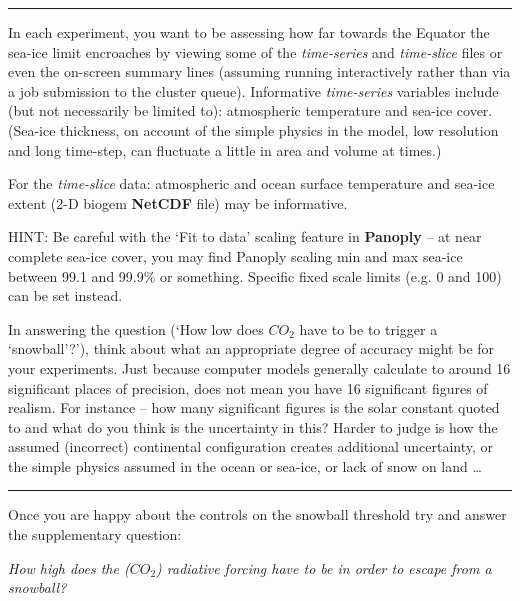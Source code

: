 \documentclass[11pt,fleqn]{book} %
\begin{document}
\vspace{1mm}
\noindent\rule{4cm}{0.5pt}
\vspace{2mm}

\noindent In each experiment, you want to be assessing how far towards the Equator the sea-ice limit encroaches by viewing some of the \textit{time-series} and \textit{time-slice} files or even the on-screen summary lines (assuming running interactively rather than via a job submission to the cluster queue). Informative \textit{time-series} variables include (but not necessarily be limited to): atmospheric temperature and sea-ice cover. (Sea-ice thickness, on account of the simple physics in the model, low resolution and long time-step, can fluctuate a little in area and volume at times.)

For the \textit{time-slice} data: atmospheric and ocean surface temperature and sea-ice extent (2-D biogem \textbf{NetCDF} file) may be informative.

HINT: Be careful with the ‘\textsf{Fit to data}’ scaling feature in \textbf{Panoply} – at near complete sea-ice cover, you may find Panoply scaling min and max sea-ice between 99.1 and 99.9\% or something. Specific fixed scale limits (e.g. 0 and 100) can be set instead.

In answering the question (‘How low does \(CO_{2}\) have to be to trigger a ‘snowball’?’), think about what an appropriate degree of accuracy might be for your experiments. Just because computer models generally calculate to around 16 significant places of precision, does not mean you have 16 significant figures of realism. For instance – how many significant figures is the solar constant quoted to and what do you think is the uncertainty in this? Harder to judge is how the assumed (incorrect) continental configuration creates additional uncertainty, or the simple physics assumed in the ocean or sea-ice, or lack of snow on land … 

\vspace{1mm}
\noindent\rule{4cm}{0.5pt}
\vspace{2mm}

\noindent Once you are happy about the controls on the snowball threshold try and answer the supplementary question:

\vspace{2mm}
\noindent \textit{How high does the (\(CO_{2}\)) radiative forcing have to be in order to escape from a snowball?}
\vspace{2mm}
\end{document}
